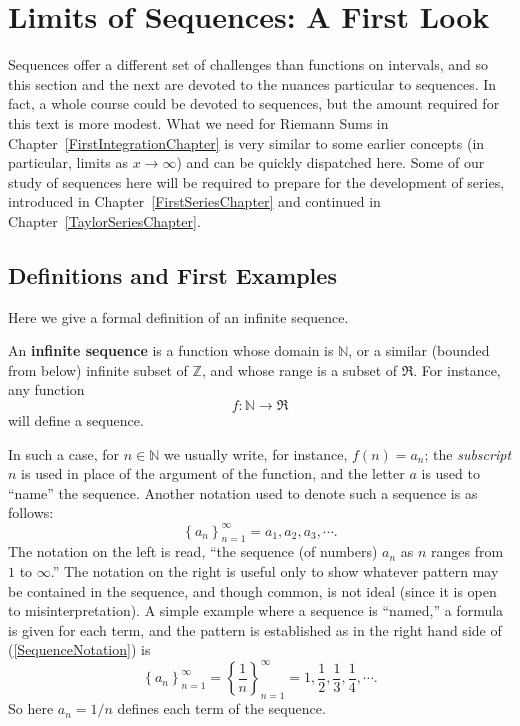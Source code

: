 \newpage
\section{Limits of Sequences: A First Look}


Sequences offer a different set of challenges than
functions on intervals, and so this section and the next are
devoted to the nuances particular to sequences.  In fact, 
a whole course could be devoted to sequences, but the
amount required for this text is more modest.
What we need for Riemann Sums in Chapter~\ref{FirstIntegrationChapter}
is very similar to some earlier concepts
(in particular, limits as $x\to\infty$) and can be
quickly dispatched here. Some of our study of
sequences here will be required 
to prepare for the development
of series, introduced in Chapter~\ref{FirstSeriesChapter}
and continued in Chapter~\ref{TaylorSeriesChapter}.
\subsection{Definitions and First Examples}
Here we give a formal definition of an infinite sequence.
\begin{definition}
An {\bf infinite sequence} is a function whose domain is
$\mathbb{N}$, or a similar (bounded from below)
infinite subset of $\mathbb{Z}$, and whose 
range is a subset of $\Re$.  For instance, any function
$$f:\mathbb{N}\longrightarrow \Re$$
will define a sequence.
\end{definition}
In such a case, for $n\in\mathbb{N}$ we usually write,
for instance, $f(n)=a_n$;
the {\it subscript} $n$ is used in place of the argument
of the function, and the letter $a$ is used to 
``name'' the sequence.  Another notation used to denote
such a sequence is as follows:
\begin{equation}\left\{a_n\right\}_{n=1}^\infty
=a_1,a_2,a_3,\cdots.\label{SequenceNotation}\end{equation}
The notation on the left is read, ``the sequence (of numbers)
$a_n$ as $n$ ranges from $1$ to $\infty$.''  The 
notation on the right is useful only to show whatever pattern
may be contained in the sequence, and though common,
is not ideal (since it is open to misinterpretation).  A simple example 
where a sequence is ``named,'' a formula is given for 
each term, and the pattern is established as in 
the right hand side of (\ref{SequenceNotation}) is
\begin{equation}\left\{a_n\right\}_{n=1}^\infty=
  \left\{\frac1n\right\}_{n=1}^\infty
  =1,\frac12,\frac13,\frac14,\cdots.\label{FirstSequenceExample}\end{equation}
So here $a_n=1/n$ defines each term of the sequence.

